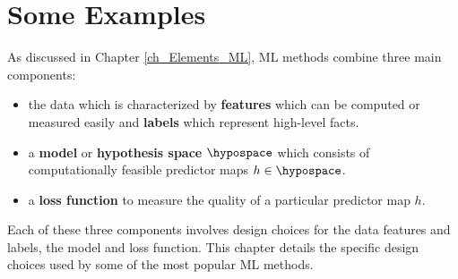 \documentclass[12pt]{report}
\begin{document}
\newpage
\chapter{Some Examples} 
\label{ch_some_examples}
As discussed in Chapter \ref{ch_Elements_ML}, ML methods combine 
three main components: 
\begin{itemize} 
\item the data which is characterized by {\bf features} which can be computed 
or measured easily and {\bf labels} which represent high-level facts. 
\item a {\bf model} or {\bf hypothesis space} $\hypospace$ which consists of 
computationally feasible predictor maps $h \in \hypospace$. 
\item a {\bf loss function} to measure the quality of a particular predictor map $h$. 
\end{itemize} 
Each of these three components involves design choices for the data 
features and labels, the model and loss function. This chapter details 
the specific design choices used by some of the most popular ML 
methods. 
\end{document}
